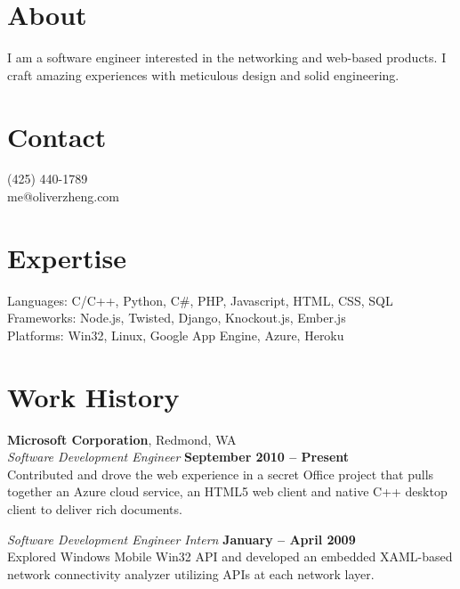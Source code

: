 \documentclass[margin,line]{resume}
\begin{document}
\begin{resume}

	\section{\mysidestyle About}
	I am a software engineer interested in the networking and web-based
	products. I craft amazing experiences with meticulous design and solid
	engineering.

	\section{\mysidestyle Contact}
	(425) 440-1789
		\vspace{1mm}\\
	me@oliverzheng.com

	\section{\mysidestyle Expertise}
	Languages: C/C++, Python, C{\#}, PHP, Javascript, HTML, CSS, SQL
		\vspace{1mm}\\
	Frameworks: Node.js, Twisted, Django, Knockout.js, Ember.js
		\vspace{1mm}\\
	Platforms: Win32, Linux, Google App Engine, Azure, Heroku

	\section{\mysidestyle Work History}

	\textbf{Microsoft Corporation}, Redmond, WA \vspace{2mm}\\\vspace{1mm}%
	\textsl{Software Development Engineer} \hfill
	\textbf{September 2010 -- Present}\\
	Contributed and drove the web experience in a secret Office project that
	pulls together an Azure cloud service, an HTML5 web client and native C++
	desktop client to deliver rich documents.

	\textsl{Software Development Engineer Intern} \hfill
	\textbf{January -- April 2009}\\
	Explored Windows Mobile Win32 API and developed an embedded XAML-based
	network connectivity analyzer utilizing APIs at each network layer.


\end{resume}
\end{document}
